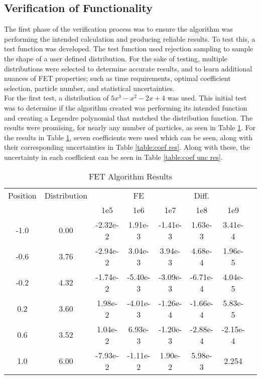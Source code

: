 \documentclass[10tma4paper]{article}
\begin{document}
\subsection{Verification of Functionality}\label{P1}

The first phase of the verification process was to ensure the algorithm was performing the intended calculation and producing reliable results. To test this, a test function was developed. The test function used rejection sampling to sample the shape of a user defined distribution. For the sake of testing, multiple distributions were selected to determine accurate results, and to learn additional nuances of FET properties; such as time requirements, optimal coefficient selection, particle number, and statistical uncertainties.
\\
For the first test, a distribution of $5x^{3}-x^{2}-2x+4$ was used. This initial test was to determine if the algorithm created was performing its intended function and creating a Legendre polynomial that matched the distribution function. The results were promising, for nearly any number of particles, as seen in Table \ref{table:alg res}. For the results in Table \ref{table:alg res}, seven coefficients were used which can be seen, along with their corresponding uncertainties in Table \ref{table:coef res}. Along with these, the uncertainty in each coefficient can be seen in Table \ref{table:coef unc res}.
\begin{table}[!htbp]
	\caption{FET Algorithm Results}
	\centering
	\begin{tabular}{c c c c c c c c}
		\hline
		Position & Distribution &  & FE &  & Diff. &  &\\[0.5ex]
		 & & 1e5 & 1e6 & 1e7 & 1e8 & 1e9 &\\
		 \hline
		 \hline
		-1.0 & 0.00 & -2.32e-2 & 1.91e-3  & -1.41e-3 & 1.63e-3  & 3.41e-4  & \\
		-0.6 & 3.76 & -2.94e-2 & 3.04e-3  & 3.94e-3  & 4.68e-4  & 1.96e-5  & \\
		-0.2 & 4.32 & -1.74e-2 & -5.40e-3 & -3.09e-3 & -6.71e-4 & 4.04e-5  & \\
		 0.2 & 3.60 & 1.98e-2  & -4.01e-3 & -1.26e-4 & -1.66e-4 & 5.83e-5  & \\
		 0.6 & 3.52 & 1.04e-2  & 6.93e-3  & -1.20e-3 & -2.88e-4 & -2.15e-4 & \\
		 1.0 & 6.00 & -7.93e-2 & -1.11e-2 & 1.90e-2  & 5.98e-3  & 2.254    & \\ [1ex]
		\hline
	\end{tabular}
	\label{table:alg res}
\end{table}
\end{document}

